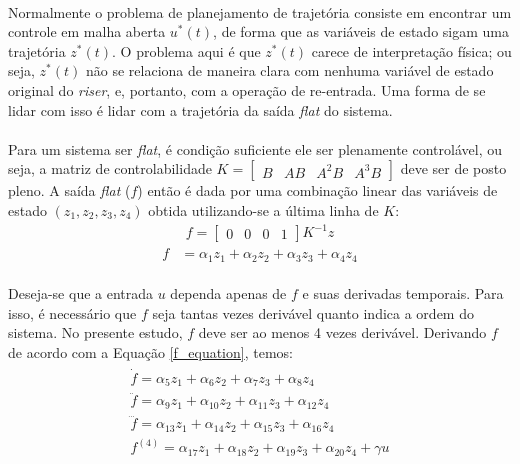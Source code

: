 \documentclass[a4paper,11pt]{scrartcl} %
\numberwithin{equation}{section} %
\numberwithin{figure}{section} %
\numberwithin{table}{section} %
\begin{document}
\paragraph{} Normalmente o problema de planejamento de trajetória consiste em encontrar um controle em malha aberta $u^*(t)$, de forma que as variáveis de estado sigam uma trajetória $z^*(t)$. O problema aqui é que $z^*(t)$ carece de interpretação física; ou seja, $z^*(t)$ não se relaciona de maneira clara com nenhuma variável de estado original do \textit{riser}, e, portanto, com a operação de re-entrada. Uma forma de se lidar com isso é lidar com a trajetória da saída \textit{flat} do sistema. %

\paragraph{} Para um sistema ser \textit{flat}, é condição suficiente ele ser plenamente controlável, ou seja, a matriz de controlabilidade $K = \left[
\begin{array}{cccc}
B & AB & A^{2}B & A^{3}B
\end{array} \right ]$ deve ser de posto pleno. A saída \textit{flat} ($f$) então é dada por uma combinação linear das variáveis de estado $\left (z_1, z_2, z_3, z_4 \right )$ obtida utilizando-se a última linha de $K$:
\begin{align}
	f = \left[\begin{array}{cccc}
	0 & 0 & 0 & 1
	\end{array}\right]K^{-1}z
\end{align} %
\begin{align}
\label{f_equation}
	f &= \alpha_1 z_1 + \alpha_2 z_2 + \alpha_3 z_3 + \alpha_4 z_4
\end{align}
\paragraph{}Deseja-se que a entrada $u$ dependa apenas de $f$ e suas derivadas temporais. Para isso, é necessário que $f$ seja tantas vezes derivável quanto indica a ordem do sistema. No presente estudo, $f$ deve ser ao menos 4 vezes derivável. Derivando $f$ de acordo com a Equação \ref{f_equation}, temos:
\begin{align}
	\label{f_derivatives}
	\begin{array}{c}
	\dot{f} = \alpha_5 z_1 + \alpha_6 z_2 + \alpha_7 z_3 + \alpha_8 z_4 \\ \ddot{f} = \alpha_9 z_1 + \alpha_{10} z_2 + \alpha_{11} z_3 + \alpha_{12} z_4 \\ \dddot{f} = \alpha_{13} z_1 + \alpha_{14} z_2 + \alpha_{15} z_3 + \alpha_{16} z_4 \\ f^{(4)} = \alpha_{17} z_1 + \alpha_{18} z_2 + \alpha_{19} z_3 + \alpha_{20} z_4 + \gamma u
	\end{array}
\end{align} %
\end{document}
